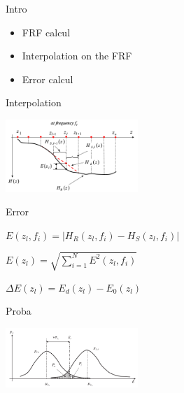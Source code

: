 \documentclass{beamer}
\begin{document}
\begin{frame}{Intro}

\begin{itemize}
\item FRF calcul
\item Interpolation on the FRF
\item Error calcul
\end{itemize}

\end{frame}


\begin{frame}{Interpolation}
\begin{center}
\includegraphics[width=5cm]{images/interpolation.png}
\end{center}

\end{frame}


\begin{frame}{Error}


\begin{center}
$E(z_l,f_i) = | H_R(z_l,f_i) - H_S(z_l,f_i) |$

\vspace{5mm}

$E(z_l) = \sqrt{  \sum\limits_{i=1}^N  E^2(z_l,f_i) }$

\vspace{5mm}

$\Delta E(z_l) = E_d(z_l) - E_0(z_l)$

\end{center}

\end{frame}

\begin{frame}{Proba}
\begin{center}
\includegraphics[width=5cm]{images/gaussiennes.png}
\end{center}
\end{frame}

\end{document}
